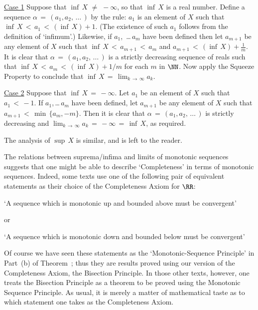 {        \underline{Case 1} Suppose that ${\inf}\,X \,\,{\neq}\,\, -{\infty}$, so that ${\inf}\,X$ is a real number.
    Define a sequence ${\alpha} \,=\, (a_{1},a_{2},\,{\ldots}\,)$ by the rule:
        $a_{1}$ is an element of $X$ such that ${\inf}\,X\,<\,a_{1}\,<\,({\inf}\,X) + 1$.
    (The existence of such $a_{1}$ follows from the definition of `infimum'.)
    Likewise, if $a_{1}$, \,{\ldots}$\,a_{m}$ have been defined then let $a_{m+1}$ be any element of $X$ such that ${\inf}\,X\,<\,a_{m+1}\,<\,a_{m}$ and ${\displaystyle a_{m+1}\,<\,({\inf}\,X) + \frac{1}{m}}$.
    It is clear that ${\alpha} \,=\, (a_{1},a_{2},\,{\ldots}\,)$ is a strictly decreasing sequence of reals such that ${\inf}\,X\,<\,a_{m}\,<\,({\inf}\,X) + 1/m$ for each $m$ in ${\NN}$.
    Now apply the Squeeze Property to conclude that ${\inf}\,X \,=\, \lim_{k \,{\rightarrow}\, {\infty}} a_{k}$.

        \underline{Case 2} Suppose that ${\inf}\,X \,=\, -{\infty}$.
    Let $a_{1}$ be an element of $X$ such that $a_{1}\,<\,-1$.
    If $a_{1}$,\,{\ldots}\,$a_{m}$ have been defined, let $a_{m+1}$ be any element of $X$ such that $a_{m+1}\,<\,\min\,\{a_{m},-m\}$.
    Then it is clear that ${\alpha} \,=\, (a_{1},a_{2},\,{\ldots}\,)$ is strictly decreasing and $\lim_{k \,{\rightarrow}\, {\infty}} a_{k} \,=\, -{\infty} \,=\, {\inf}\,X$, as required.

        The analysis of ${\sup}\,X$ is similar, and is left to the reader.
}%
\V
\V


        The relations between suprema/infima and limits of monotonic sequences suggests that one might be able to describe `Completeness' in terms of monotonic sequences.
        Indeed, some texts use one of the following pair of equivalent statements as their choice of the Completeness Axiom for ${\RR}$:

        `A sequence which is monotonic up and bounded above must be convergent'

\noindent or

        `A sequence which is monotonic down and bounded below must be convergent'

\noindent Of course we have seen these statements as the `Monotonic-Sequence Principle' in Part~(b) of Theorem~;
    thus they are results proved using our version of the Completeness Axiom, the Bisection Principle.
    In those other texts, however, one treats the Bisection Principle as a theorem to be proved using the Monotonic Sequence Principle.
    As usual, it is merely a matter of mathematical taste as to which statement one takes as the Completeness Axiom.

